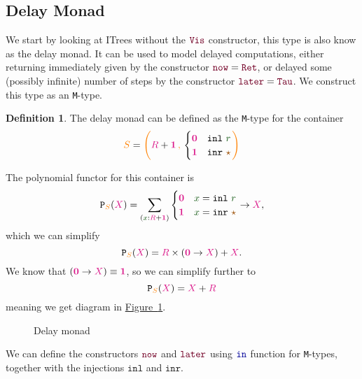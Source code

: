 \documentclass[twoside,11pt,openright]{report}
\theoremstyle{plain} %
\theoremstyle{definition}
\newtheorem{defn}[thm]{Definition}%
\theoremstyle{remark}
\newcommand*{\figref}[1]{\hyperref[fig:#1]{Figure~\ref*{fig:#1}}}
\newcommand*{\term}[1]{\textcolor{green!30!black}{#1}} %
\newcommand*{\type}[1]{\textcolor{magenta!90!black}{#1}}
\newcommand*{\container}[1]{\textcolor{orange}{#1}}
\newcommand*{\containerpair}[2]{\ensuremath{\colorlet{savedleftcolor}{.}\color{orange}\left(\color{savedleftcolor}#1\,\textcolor{orange}{\mathbf{,}}\,#2\color{orange}\right)\color{savedleftcolor}}}
\newcommand*{\unit}{\type{\textbf{1}}}
\newcommand*{\empt}{\type{\textbf{0}}}
\newcommand*{\constant}[1]{\textcolor{orange!60!black}{\ensuremath{\mathtt{#1}}}}
\newcommand*{\function}[1]{\textcolor{blue!60!black}{\ensuremath{\mathtt{#1}}}}
\newcommand*{\constructor}[1]{\textcolor{purple!60!black}{\ensuremath{\mathtt{#1}}}}
\newcommand*{\typeformer}[1]{\ensuremath{\mathtt{#1}}}
\newcommand*{\functor}[1]{\ensuremath{\mathbf{\mathtt{#1}}}}
\newcommand*{\unitelem}{\constant{\star}} %
\begin{document}
\subsection{Delay Monad}
We start by looking at ITrees without the \(\constructor{Vis}\) constructor, this type is also know as the delay monad. It can be used to model delayed computations, either returning immediately given by the constructor \(\constructor{now} = \constructor{Ret}\), or delayed some (possibly infinite) number of steps by the constructor \(\constructor{later} = \constructor{Tau}\). We construct this type as an \texttt{M}-type.
\begin{defn}
  The  delay monad can be defined as the \texttt{M}-type for the container
  \begin{equation}
    \container{S} = \containerpair{\type{R} +\unit}{\begin{cases} \empt & \mathtt{inl}~\term{r} \\ \unit & \mathtt{inr}~\unitelem \end{cases}}
  \end{equation}
\end{defn}
\noindent The polynomial functor for this container is
\begin{equation}
  \functor{P}_{\container{S}}(\type{X}) = \sum_{(\term{x} : \type{R} + \unit)} \begin{cases} \empt & \term{x} = \mathtt{inl}~\term{r} \\ \unit & \term{x} = \mathtt{inr}~\unitelem \end{cases} \rightarrow \type{X},
\end{equation}
which we can simplify
\begin{equation}
  \functor{P}_{\container{S}}(\type{X}) = \type{R} \times (\empt \rightarrow \type{X}) + \type{X}.
\end{equation}
We know that \((\empt \rightarrow \type{X}) \equiv \unit\), so we can simplify further to
\begin{equation}
  \functor{P}_{\container{S}}(\type{X}) = \type{X} + \type{R}
\end{equation}
meaning we get diagram in \figref{delay-monad}.
\begin{figure}[h]
  \centering
  \caption{Delay monad}
  \label{fig:delay-monad}
\end{figure}
\noindent We can define the constructors \(\constructor{now}\) and \(\constructor{later}\) using \(\function{in}\) function for \texttt{M}-types, together with the injections \(\mathtt{inl}\) and \(\mathtt{inr}\).
\end{document}
